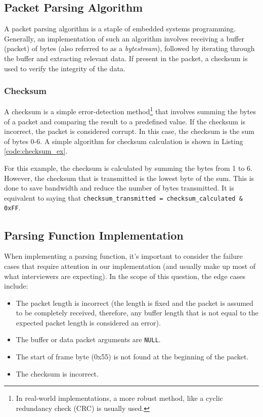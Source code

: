\documentclass[main.tex]{subfiles}
\begin{document}
\spoilerlineraw

\subsection{Packet Parsing Algorithm}
A packet parsing algorithm is a staple of embedded systems programming. Generally, an implementation of such an algorithm involves receiving a buffer (packet) of bytes (also referred to as a \textit{bytestream}), followed by iterating through the buffer and extracting relevant data. If present in the packet, a checksum is used to verify the integrity of the data.

\subsubsection{Checksum}
A checksum is a simple error-detection method\footnote{In real-world implementations, a more robust method, like a cyclic redundancy check (CRC) is usually used.} that involves summing the bytes of a packet and comparing the result to a predefined value. If the checksum is incorrect, the packet is considered corrupt. In this case, the checksum is the sum of bytes 0-6. A simple algorithm for checksum calculation is shown in Listing \ref{code:checksum_ex}.



\noindent For this example, the checksum is calculated by summing the bytes from 1 to 6. However, the checksum that is transmitted is the lowest byte of the sum. This is done to save bandwidth and reduce the number of bytes transmitted. It is equivalent to saying that \texttt{checksum\_transmitted = checksum\_calculated \& 0xFF}.

\subsection{Parsing Function Implementation}
When implementing a parsing function, it's important to consider the failure cases that require attention in our implementation (and usually make up most of what interviewers are expecting). In the scope of this question, the edge cases include:
\begin{itemize}
    \item The packet length is incorrect (the length is fixed and the packet is assumed to be completely received, therefore, any buffer length that is not equal to the expected packet length is considered an error).
    \item The buffer or data packet arguments are \texttt{NULL}.
    \item The start of frame byte (0x55) is not found at the beginning of the packet.
    \item The checksum is incorrect.
\end{itemize}
\end{document}
